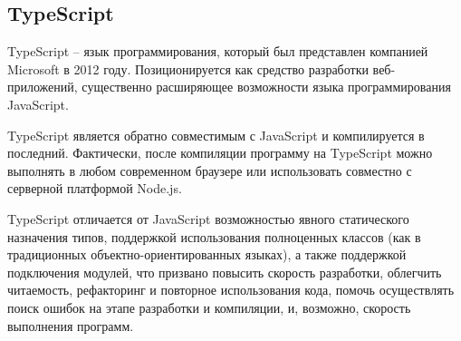 \subsection{TypeScript}

TypeScript – язык программирования, который был представлен компанией Microsoft в 2012 году. Позиционируется как средство разработки веб-приложений, существенно расширяющее возможности языка программирования JavaScript.

TypeScript является обратно совместимым с JavaScript и компилируется в последний. Фактически, после компиляции программу на TypeScript можно выполнять в любом современном браузере или использовать совместно с серверной платформой Node.js.

TypeScript отличается от JavaScript возможностью явного статического назначения типов, поддержкой использования полноценных классов (как в традиционных объектно-ориентированных языках), а также поддержкой подключения модулей, что призвано повысить скорость разработки, облегчить читаемость, рефакторинг и повторное использования кода, помочь осуществлять поиск ошибок на этапе разработки и компиляции, и, возможно, скорость выполнения программ.
